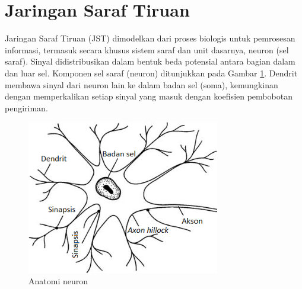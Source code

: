 

\section{Jaringan Saraf Tiruan}
Jaringan Saraf Tiruan (JST) dimodelkan dari proses biologis untuk pemrosesan informasi, termasuk secara khusus sistem saraf dan unit dasarnya, neuron (sel saraf). Sinyal didistribusikan dalam bentuk beda potensial antara bagian dalam dan luar sel. Komponen sel saraf (neuron) ditunjukkan pada Gambar \ref{fig:3:neuron}. Dendrit membawa sinyal dari neuron lain ke dalam badan sel (soma), kemungkinan dengan memperkalikan setiap sinyal yang masuk dengan koefisien pembobotan pengiriman.

\begin{figure}[!h]
	\centering
	\includegraphics[width=0.75\textwidth]{figures/neuron}
	\caption{Anatomi neuron}
	\label{fig:3:neuron}
\end{figure}


